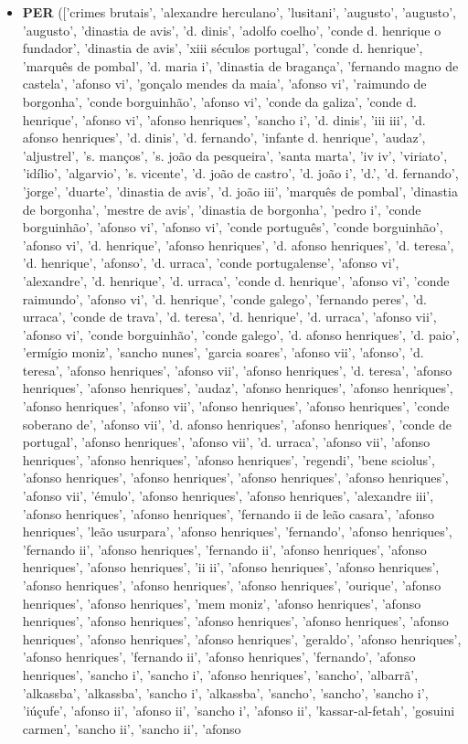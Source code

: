 \documentclass{article}
\begin{document}
\begin{itemize}
\item \textbf{PER} (['crimes brutais', 'alexandre herculano', 'lusitani', 'augusto', 'augusto', 'augusto', 'dinastia de avis', 'd. dinis', 'adolfo coelho', 'conde d. henrique o fundador', 'dinastia de avis', 'xiii séculos portugal', 'conde d. henrique', 'marquês de pombal', 'd. maria i', 'dinastia de bragança', 'fernando magno de castela', 'afonso vi', 'gonçalo mendes da maia', 'afonso vi', 'raimundo de borgonha', 'conde borguinhão', 'afonso vi', 'conde da galiza', 'conde d. henrique', 'afonso vi', 'afonso henriques', 'sancho i', 'd. dinis', 'iii iii', 'd. afonso henriques', 'd. dinis', 'd. fernando', 'infante d. henrique', 'audaz', 'aljustrel', 's. manços', 's. joão da pesqueira', 'santa marta', 'iv iv', 'viriato', 'idílio', 'algarvio', 's. vicente', 'd. joão de castro', 'd. joão i', 'd.', 'd. fernando', 'jorge', 'duarte', 'dinastia de avis', 'd. joão iii', 'marquês de pombal', 'dinastia de borgonha', 'mestre de avis', 'dinastia de borgonha', 'pedro i', 'conde borguinhão', 'afonso vi', 'afonso vi', 'conde português', 'conde borguinhão', 'afonso vi', 'd. henrique', 'afonso henriques', 'd. afonso henriques', 'd. teresa', 'd. henrique', 'afonso', 'd. urraca', 'conde portugalense', 'afonso vi', 'alexandre', 'd. henrique', 'd. urraca', 'conde d. henrique', 'afonso vi', 'conde raimundo', 'afonso vi', 'd. henrique', 'conde galego', 'fernando peres', 'd. urraca', 'conde de trava', 'd. teresa', 'd. henrique', 'd. urraca', 'afonso vii', 'afonso vi', 'conde borguinhão', 'conde galego', 'd. afonso henriques', 'd. paio', 'ermígio moniz', 'sancho nunes', 'garcia soares', 'afonso vii', 'afonso', 'd. teresa', 'afonso henriques', 'afonso vii', 'afonso henriques', 'd. teresa', 'afonso henriques', 'afonso henriques', 'audaz', 'afonso henriques', 'afonso henriques', 'afonso henriques', 'afonso vii', 'afonso henriques', 'afonso henriques', 'conde soberano de', 'afonso vii', 'd. afonso henriques', 'afonso henriques', 'conde de portugal', 'afonso henriques', 'afonso vii', 'd. urraca', 'afonso vii', 'afonso henriques', 'afonso henriques', 'afonso henriques', 'regendi', 'bene sciolus', 'afonso henriques', 'afonso henriques', 'afonso henriques', 'afonso henriques', 'afonso vii', 'émulo', 'afonso henriques', 'afonso henriques', 'alexandre iii', 'afonso henriques', 'afonso henriques', 'fernando ii de leão casara', 'afonso henriques', 'leão usurpara', 'afonso henriques', 'fernando', 'afonso henriques', 'fernando ii', 'afonso henriques', 'fernando ii', 'afonso henriques', 'afonso henriques', 'afonso henriques', 'ii ii', 'afonso henriques', 'afonso henriques', 'afonso henriques', 'afonso henriques', 'afonso henriques', 'ourique', 'afonso henriques', 'afonso henriques', 'mem moniz', 'afonso henriques', 'afonso henriques', 'afonso henriques', 'afonso henriques', 'afonso henriques', 'afonso henriques', 'afonso henriques', 'afonso henriques', 'geraldo', 'afonso henriques', 'afonso henriques', 'fernando ii', 'afonso henriques', 'fernando', 'afonso henriques', 'sancho i', 'sancho i', 'afonso henriques', 'sancho', 'albarrã', 'alkassba', 'alkassba', 'sancho i', 'alkassba', 'sancho', 'sancho', 'sancho i', 'iúçufe', 'afonso ii', 'afonso ii', 'sancho i', 'afonso ii', 'kassar-al-fetah', 'gosuini carmen', 'sancho ii', 'sancho ii', 'afonso 
\end{itemize}
\end{document}
